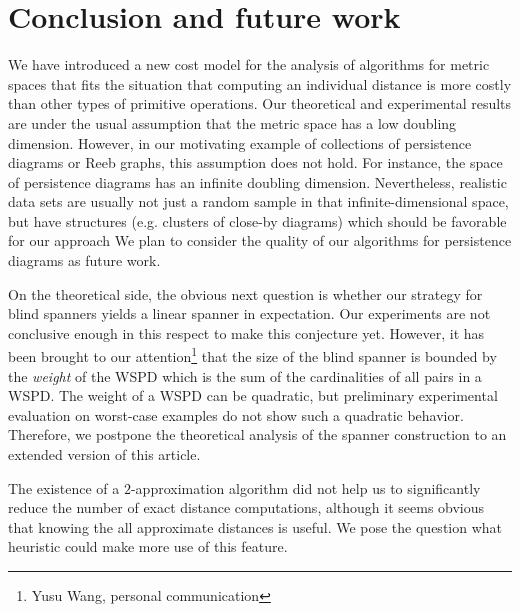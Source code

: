 \documentclass[a4paper,UKenglish,cleveref, autoref]{lipics-v2019}
\begin{document}
\section{Conclusion and future work}
\label{sec:conclusion}
%
We have introduced a new cost model for the analysis of algorithms
for metric spaces that fits the situation that computing an individual distance
is more costly than other types of primitive operations.
Our theoretical and experimental results are under the usual assumption
that the metric space has a low doubling dimension.
However, in our motivating example of collections of persistence diagrams
or Reeb graphs, this assumption does not hold. For instance,
the space of persistence diagrams has an infinite doubling dimension.
Nevertheless, realistic data sets are usually not just a random sample
in that infinite-dimensional space, but have structures
(e.g. clusters of close-by diagrams) which should be favorable for our approach
We plan to consider the quality of our algorithms for persistence diagrams
as future work.

On the theoretical side, the obvious next question is whether our strategy
for blind spanners yields a linear spanner in expectation. 
Our experiments are not conclusive enough in this respect to make this conjecture yet.
However, it has been brought to our attention\footnote{Yusu Wang, personal communication}
that the size of the blind spanner is bounded by the \emph{weight} of the WSPD
which is the sum of the  cardinalities of all pairs in a WSPD.
The weight of a WSPD can be quadratic, but preliminary
experimental evaluation on worst-case examples do not show such a quadratic
behavior. Therefore, we postpone the theoretical analysis of the spanner construction
to an extended version of this article.

The existence of a $2$-approximation algorithm did not help us to significantly
reduce the number of exact distance computations, although it seems obvious
that knowing the all approximate distances is useful.
We pose the question what heuristic could make more use of this feature.



\end{document}
